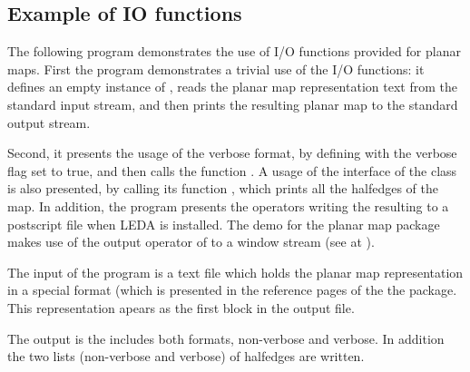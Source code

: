 \subsection{Example of IO functions}
\label{PM_sec:example9}

The following program demonstrates the use of I/O functions provided for planar maps. %
First the program demonstrates a trivial use of the I/O functions: 
it defines an empty instance of , 
reads the planar map representation text from the standard input stream, 
and then prints the resulting planar map to the standard output stream.

Second, it presents the usage of the verbose format, 
by defining  with the verbose flag set to true, 
and then calls the function .
A usage of the interface of the class  is also presented, 
by calling its function , which prints all the halfedges of the map.
In addition, the program presents the operators writing the resulting 
 to a postscript file when LEDA is installed. 
The demo for the planar map package makes use of the output operator 
of  to a window stream  
(see at  ).   



The input of the program is a text file which holds the planar map representation in a special format (which is presented in the reference pages of the the  package. 
This representation apears as the first block in the output file.
 

The output is the  includes both formats, non-verbose and verbose. In addition the two lists 
(non-verbose and verbose) of halfedges are written.















